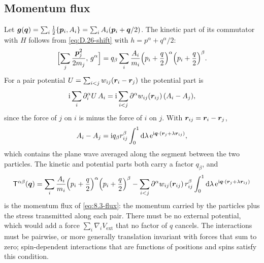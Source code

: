 \subsection{Momentum flux}

Let $\bm{g}(\bm{q}) = \sum_i\frac12\{\bm{p}_i, A_i\} = \sum_iA_i(\bm{p}_i + \bm{q}/2)$. The kinetic part of its commutator with $H$ follows from \cref{eq:D.26-shift} with $h = p^\alpha + q^\alpha/2$:
\begin{equation*}
  \Bigl[\sum_j\frac{\bm{p}_j^2}{2m_j},\,g^\alpha\Bigr] = q_\beta\sum_i\frac{A_i}{m_i}\Bigl(p_i + \frac{q}{2}\Bigr)^\alpha\Bigl(p_i + \frac{q}{2}\Bigr)^\beta .
\end{equation*}
For a pair potential $U = \sum_{i<j}w_{ij}(\bm{r}_i - \bm{r}_j)$ the potential part is
\begin{equation*}
  \mathrm{i}\sum_i\partial_i^\alpha U\,A_i = \mathrm{i}\sum_{i<j}\partial^\alpha w_{ij}(\bm{r}_{ij})\,(A_i - A_j) ,
\end{equation*}
since the force of $j$ on $i$ is minus the force of $i$ on $j$. With $\bm{r}_{ij} = \bm{r}_i - \bm{r}_j$,
\begin{equation*}
  A_i - A_j = \mathrm{i} q_\beta r_{ij}^\beta\int_0^1\mathrm{d}\lambda\,\mathrm{e}^{\mathrm{i}\bm{q}\cdot(\bm{r}_j + \lambda\bm{r}_{ij})} ,
\end{equation*}
which contains the plane wave averaged along the segment between the two particles. The kinetic and potential parts both carry a factor $q_\beta$, and
\begin{equation}
  \mathsf{T}^{\alpha\beta}(\bm{q}) = \sum_i\frac{A_i}{m_i}\Bigl(p_i + \frac{q}{2}\Bigr)^\alpha\Bigl(p_i + \frac{q}{2}\Bigr)^\beta - \sum_{i<j}\partial^\alpha w_{ij}(\bm{r}_{ij})\,r_{ij}^\beta\int_0^1\mathrm{d}\lambda\,\mathrm{e}^{\mathrm{i}\bm{q}\cdot(\bm{r}_j + \lambda\bm{r}_{ij})}
  \label{eq:D.26-flux}
\end{equation}
is the momentum flux of \cref{eq:8.3-flux}: the momentum carried by the particles plus the stress transmitted along each pair. There must be no external potential, which would add a force $\sum_i\nabla_iV_{\mathrm{ext}}$ that no factor of $q$ cancels. The interactions must be pairwise, or more generally translation invariant with forces that sum to zero; spin-dependent interactions that are functions of positions and spins satisfy this condition.

